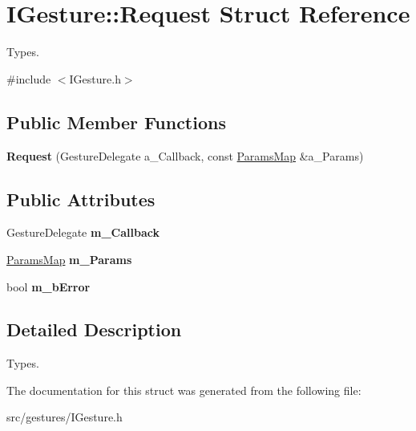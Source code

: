 \hypertarget{struct_i_gesture_1_1_request}{}\section{I\+Gesture\+:\+:Request Struct Reference}
\label{struct_i_gesture_1_1_request}


Types.  




{\ttfamily \#include $<$I\+Gesture.\+h$>$}

\subsection*{Public Member Functions}
\begin{DoxyCompactItemize}
\item 
\mbox{\label{struct_i_gesture_1_1_request_ae89699048ee743dde5e9fa0ac41e015d}} 
{\bfseries Request} (Gesture\+Delegate a\+\_\+\+Callback, const \hyperlink{class_params_map}{Params\+Map} \&a\+\_\+\+Params)
\end{DoxyCompactItemize}
\subsection*{Public Attributes}
\begin{DoxyCompactItemize}
\item 
\mbox{\label{struct_i_gesture_1_1_request_a9527efcd10958328eff43c2090d46203}} 
Gesture\+Delegate {\bfseries m\+\_\+\+Callback}
\item 
\mbox{\label{struct_i_gesture_1_1_request_a94dfc74d2c8a063def060f4a5b676305}} 
\hyperlink{class_params_map}{Params\+Map} {\bfseries m\+\_\+\+Params}
\item 
\mbox{\label{struct_i_gesture_1_1_request_a7bd412fd2d357709b5961c9a723621f4}} 
bool {\bfseries m\+\_\+b\+Error}
\end{DoxyCompactItemize}


\subsection{Detailed Description}
Types. 

The documentation for this struct was generated from the following file\+:\begin{DoxyCompactItemize}
\item 
src/gestures/I\+Gesture.\+h\end{DoxyCompactItemize}
